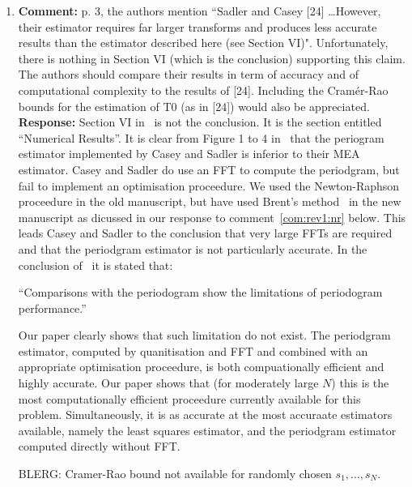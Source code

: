 \documentclass[a4paper,10pt]{article}
\begin{document}
\begin{enumerate}
\item\textbf{Comment:}
p. 3, the authors mention “Sadler and Casey [24] \dots However, their estimator
requires far larger transforms and produces less accurate results than the estimator
described here (see Section VI)". Unfortunately, there is nothing in
Section VI (which is the conclusion) supporting this claim. The authors should
compare their results in term of accuracy and of computational complexity to
the results of [24]. Including the Cramér-Rao bounds for the estimation of T0
(as in [24]) would also be appreciated.
\\
\textbf{Response:}
Section VI in~\cite{726812} is not the conclusion.  It is the section entitled ``Numerical Results''.  It is clear from Figure 1 to 4 in~\cite{726812} that the periogram estimator implemented by Casey and Sadler is inferior to their MEA estimator.  Casey and Sadler do use an FFT to compute the periodgram, but fail to implement an optimisation proceedure.  We used the Newton-Raphson proceedure in the old manuscript, but have used Brent's method~\cite{Brent_opt_no_derivs_1973} in the new manuscript as dicussed in our response to comment~\ref{com:rev1:nr} below.  This leads Casey and Sadler to the conclusion that very large FFTs are required and that the periodgram estimator is not particularly accurate.  In the conclusion of~\cite{726812} it is stated that:

``Comparisons with the periodogram show the limitations of periodogram performance.''

Our paper clearly shows that such limitation do not exist.  The periodgram estimator, computed by quanitisation and FFT and combined with an appropriate optimisation proceedure, is both compuationally efficient and highly accurate.  Our paper shows that (for moderately large $N$) this is the most computationally efficient proceedure currently available for this problem.  Simultaneously, it is as accurate at the most accuraate estimators available, namely the least squares estimator, and the periodgram estimator computed directly without FFT.

BLERG: Cramer-Rao bound not available for randomly chosen $s_1,\dots,s_N$.



\end{enumerate}
\end{document}
